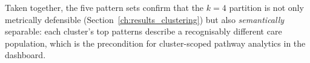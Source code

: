 Taken together, the five pattern sets confirm that the $k{=}4$ partition is not only metrically defensible (Section~\ref{ch:results_clustering}) but also \emph{semantically} separable: each cluster's top patterns describe a recognisably different care population, which is the precondition for cluster-scoped pathway analytics in the dashboard.
